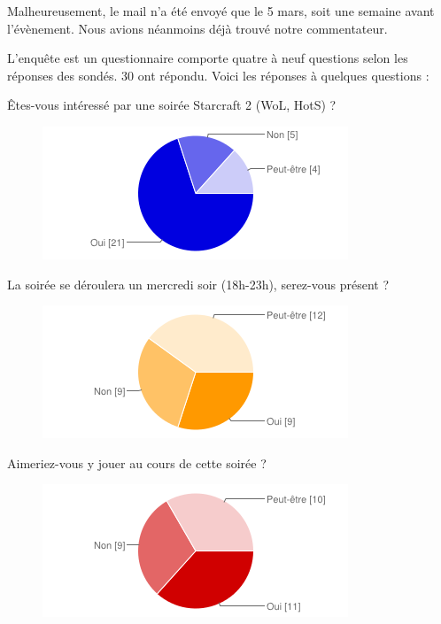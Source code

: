 Malheureusement, le mail n'a été envoyé que le 5 mars, soit une semaine avant l'évènement.
Nous avions néanmoins déjà trouvé notre commentateur.

L'enquête est un questionnaire comporte quatre à neuf questions selon les réponses des sondés. 30 ont répondu.
Voici les réponses à quelques questions :

Êtes-vous intéressé par une soirée Starcraft 2 (WoL, HotS) ?

\begin{figure}
  \begin{center}
    \includegraphics[scale=1.57]{images/chart_1.png}
    \caption{}
    \label{flow}
  \end{center}
\end{figure}

La soirée se déroulera un mercredi soir (18h-23h), serez-vous présent ?

\begin{figure}
  \begin{center}
    \includegraphics[scale=1.57]{images/chart_2.png}
    \caption{}
    \label{flow}
  \end{center}
\end{figure}

Aimeriez-vous y jouer au cours de cette soirée ?

\begin{figure}
  \begin{center}
    \includegraphics[scale=1.57]{images/chart_3.png}
    \caption{}
    \label{flow}
  \end{center}
\end{figure}

